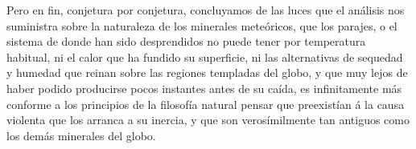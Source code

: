 \documentclass[a4paper, 12pt, oneside, spanish]{article}
\begin{document}
Pero en fin, conjetura por conjetura, concluyamos de las luces que el análisis nos suministra sobre la naturaleza de los minerales meteóricos, que los parajes, o el sistema de donde han sido desprendidos no puede tener por temperatura habitual, ni el calor que ha fundido su superficie, ni las alternativas de sequedad y humedad que reinan sobre las regiones templadas del globo, y que muy lejos de haber podido producirse pocos instantes antes de su caída, es infinitamente más conforme a los principios de la filosofía natural pensar que preexistían á la causa violenta que los arranca a su inercia, y que son verosímilmente tan antiguos como los demás minerales del globo.
\clearpage
\end{document}
